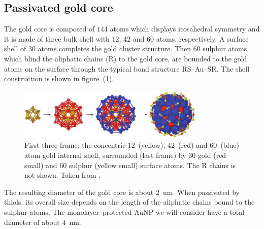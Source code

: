 \subsection{Passivated gold core}
The gold core is composed of $144$ atoms which displays icosahedral symmetry and it is made of three bulk shell with $12$, $42$ and $60$ atoms, respectively. A surface shell of $30$ atoms completes the gold cluster structure. Then $60$ sulphur atoms, which blind the aliphatic chains (R) to the gold core, are bounded to the gold atoms on the surface through the typical bond structure RS--Au--SR. The shell construction is shown in figure~(\ref{fig:goldShell}).
\begin{figure}[!ht]
	\centering
	\includegraphics[width=0.8\textwidth]{./img/goldShell}
	\caption{First three frame: the concentric $12$--(yellow), $42$--(red) and $60$--(blue) atom gold internal shell, surrounded (last frame) by $30$ gold (red small) and $60$ sulphur (yellow small) surface atoms. The R chains is not shown. Taken from \cite{corePassivated}.}
	\label{fig:goldShell}
\end{figure}

The resulting diameter of the gold core is about $2$~nm. When passivated by thiols, its overall size depends on the length of the aliphatic chains bound to the sulphur atoms. The monolayer--protected \ac{AuNP} we will consider have a total diameter of about $4$~nm.

